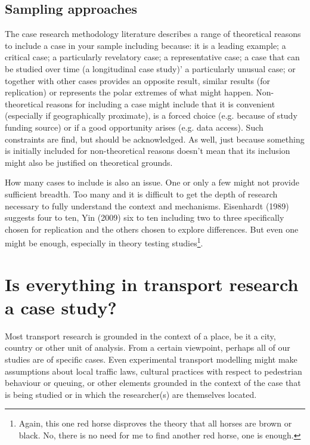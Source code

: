 \documentclass{tufte-handout}
\begin{document}
\subsection{Sampling approaches}
The case research methodology literature describes a range of theoretical reasons to include a case in your sample including because: it is a leading example; a critical case; a particularly revelatory case; a representative case; a case that can be studied over time (a longitudinal case study)' a particularly unusual case; or together with other cases provides an opposite result, similar results (for replication) or represents the polar extremes of what might happen. Non-theoretical reasons for including a case might include that it is convenient (especially if geographically proximate), is a forced choice (e.g. because of study funding source) or if a good opportunity arises (e.g. data access)\cite{Eisenhardt1989aa, Meredith1998aa, Stuart2002aa, Voss2002aa,}. Such constraints are find, but should be acknowledged. As well, just because something is initially included for non-theoretical reasons doesn't mean that its inclusion might also be justified on theoretical grounds.  

How many cases to include is also an issue.  One or only a few might not provide sufficient breadth.  Too many and it is difficult to get the depth of research necessary to fully understand the context and mechanisms. Eisenhardt (1989) suggests four to ten, Yin (2009) six to ten including two to three specifically chosen for replication and the others chosen to explore differences.  But even one might be enough, especially in theory testing studies\footnote{Again, this one red horse disproves the theory that all horses are brown or black.  No, there is no need for me to find another red horse, one is enough.}.


\section{Is everything in transport research a case study?}
Most transport research is grounded in the context of a place, be it a city, country or other unit of analysis. From a certain viewpoint, perhaps all of our studies are of specific cases.  Even experimental transport modelling might make assumptions about local traffic laws, cultural practices with respect to pedestrian behaviour or queuing, or other elements grounded in the context of the case that is being studied or in which the researcher(s) are themselves located. 
\end{document}
